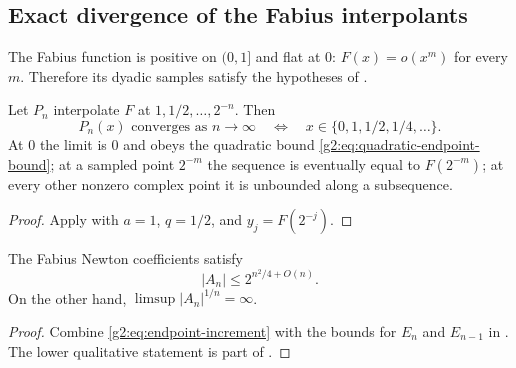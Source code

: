 \subsection{Exact divergence of the Fabius interpolants}

The Fabius function is positive on $(0,1]$ and flat at $0$:
$F(x)=o(x^m)$ for every $m$.  Therefore its dyadic samples satisfy the
hypotheses of .

\begin{corollary}
\label{g2:cor:fabius-convergence-set}
Let $P_n$ interpolate $F$ at $1,1/2,\ldots,2^{-n}$.  Then
\begin{equation}
 P_n(x)\text{ converges as }n\to\infty
 \quad\Longleftrightarrow\quad
 x\in\{0,1,1/2,1/4,\ldots\}.
 \label{g2:eq:fabius-convergence-set}
\end{equation}
At $0$ the limit is $0$ and obeys the quadratic bound
\eqref{g2:eq:quadratic-endpoint-bound}; at a sampled point $2^{-m}$ the sequence
is eventually equal to $F(2^{-m})$; at every other nonzero complex point it is
unbounded along a subsequence.
\end{corollary}

\begin{proof}
Apply  with $a=1$, $q=1/2$, and
$y_j=F(2^{-j})$.
\end{proof}

\begin{corollary}
\label{g2:cor:coefficient-upper}
The Fabius Newton coefficients satisfy
\begin{equation}
 |A_n|\le2^{n^2/4+O(n)}.
 \label{g2:eq:coefficient-upper}
\end{equation}
On the other hand, $\limsup|A_n|^{1/n}=\infty$.
\end{corollary}

\begin{proof}
Combine \eqref{g2:eq:endpoint-increment} with the bounds for $E_n$ and $E_{n-1}$
in .  The lower qualitative statement is
part of .
\end{proof}


